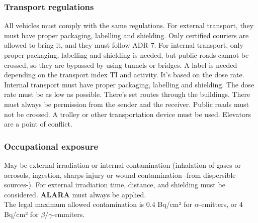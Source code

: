 \subsubsection{Transport regulations}
All vehicles must comply with the same regulations. For external transport, they must have proper packaging, labelling and shielding. Only certified couriers are allowed to bring it, and they must follow ADR-7. For internal transport, only proper packaging, labelling and shielding is needed, but public roads cannot be crossed, so they are bypassed by using tunnels or bridges. A label is needed depending on the transport index TI and activity. It's based on the dose rate. \\
Internal transport must have proper packaging, labelling and shielding. The dose rate must be as low as possible. There's set routes through the buildings. There must always be permission from the sender and the receiver. Public roads must not be crossed. A trolley or other transportation device must be used. Elevators are a point of conflict.

\subsubsection{Occupational exposure}
May be external irradiation or internal contamination (inhalation of gases or aerosols, ingestion, sharps injury or wound contamination -from dispersible sources-). For external irradiation time, distance, and shielding must be considered. \textbf{ALARA} must always be applied.\\
The legal maximum allowed contamination is 0.4 Bq/cm² for $\alpha$-emitters, or 4 Bq/cm² for $\beta/\gamma$-emmiters.


